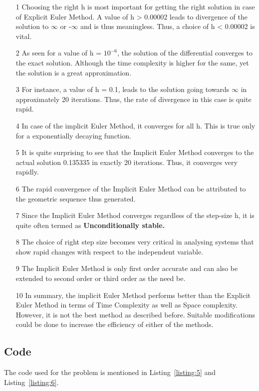 \documentclass[titlepage, 11pt]{article}
\begin{document}
\begin{itemize}
    \item [1] Choosing the right h is most important for getting the right solution in case of Explicit Euler Method. A value of h > 0.00002 leads to divergence of the solution to $\infty$ or -$\infty$ and is thus meaningless. Thus, a choice of h < 0.00002 is vital. 
    \item [2] As seen for a value of h = $10^{-6}$, the solution of the differential converges to the exact solution. Although the time complexity is higher for the same, yet the solution is a great approximation. 
    \item [3] For instance, a value of h = 0.1, leads to the solution going towards $\infty$ in approximately 20 iterations. Thus, the rate of divergence in this case is quite rapid.
    \item [4] In case of the implicit Euler Method, it converges for all h. This is true only for a exponentially decaying function. 
    \item [5] It is quite surprising to see that the Implicit Euler Method converges to the actual solution 0.135335 in exactly 20 iterations. Thus, it converges very rapidly. 
    \item [6] The rapid convergence of the Implicit Euler Method can be attributed to the geometric sequence thus generated. 
    \item [7] Since the Implicit Euler Method converges regardless of the step-size h, it is quite often termed as \textbf{Unconditionally stable.}
    \item [8] The choice of right step size becomes very critical in analysing systems that show rapid changes with respect to the independent variable.
    \item [9] The Implicit Euler Method is only first order accurate and can also be extended to second order or third order as the need be. 
    \item [10] In summary, the implicit Euler Method performs better than the Explicit Euler Method in terms of Time Complexity as well as Space complexity. However, it is not the best method as described before. Suitable  modifications could be done to increase the efficiency of either of the methods.
\end{itemize}


\subsection{Code}
The code used for the problem is mentioned in Listing~\ref{listing:5} and Listing~\ref{listing:6}. 
\end{document}
